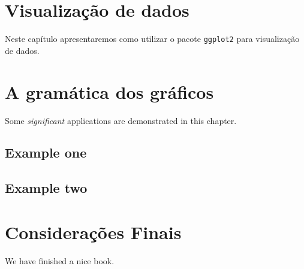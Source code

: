 \documentclass[
  brazilian,
]{book}
\begin{document}
\hypertarget{visualizauxe7uxe3o-de-dados}{%
\chapter{Visualização de dados}\label{visualizauxe7uxe3o-de-dados}}

Neste capítulo apresentaremos como utilizar o pacote \texttt{ggplot2} para visualização de dados.

\hypertarget{a-gramuxe1tica-dos-gruxe1ficos}{%
\chapter{A gramática dos gráficos}\label{a-gramuxe1tica-dos-gruxe1ficos}}

Some \emph{significant} applications are demonstrated in this chapter.

\hypertarget{example-one}{%
\section{Example one}\label{example-one}}

\hypertarget{example-two}{%
\section{Example two}\label{example-two}}

\hypertarget{considerauxe7uxf5es-finais}{%
\chapter{Considerações Finais}\label{considerauxe7uxf5es-finais}}

We have finished a nice book.

\renewcommand{\bibname}{Referências}

  
\end{document}

